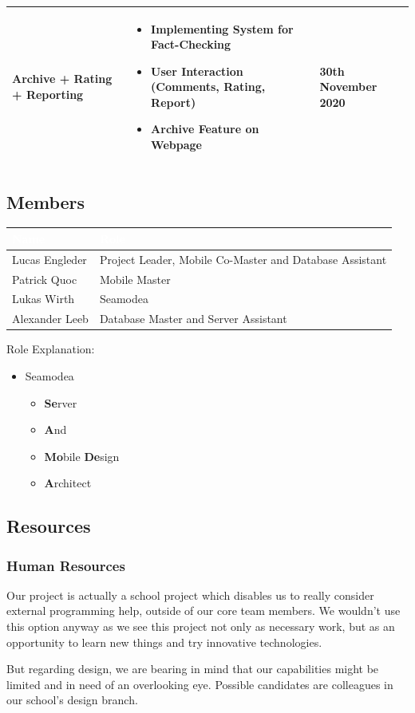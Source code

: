 \documentclass[12pt]{article}
\theoremstyle{definition}
\newenvironment{text}{
}{}
\begin{document}
\begin{tabular}{| m{9em} | m{9cm} | m{4cm} |}
    Archive + Rating + Reporting &
    \begin{itemize} [topsep=0.2cm]
        \item Implementing System for Fact-Checking
    	\item User Interaction (Comments, Rating, Report)
        \item Archive Feature on Webpage
    \end{itemize} \nointerlineskip &
    30th November 2020 \\ \hline
\end{tabular}

\subsection{Members}
\begin{tabular}{|l|l|}
\hline
\cellcolor[gray]{0.5}\textcolor{white}{Name} & \cellcolor[gray]{0.5}\textcolor{white}{Role}\\ \hline
Lucas Engleder & Project Leader, Mobile Co-Master and Database Assistant\\ \hline
Patrick Quoc & Mobile Master\\ \hline
Lukas Wirth & Seamodea \\  \hline
Alexander Leeb & Database Master and Server Assistant \\ \hline
\end{tabular}

Role Explanation:
\begin{itemize}
    \item Seamodea
    \begin{itemize}
        \item \textbf{Se}rver
        \item \textbf{A}nd
        \item \textbf{Mo}bile \textbf{De}sign
        \item \textbf{A}rchitect
    \end{itemize} 
\end{itemize}
\subsection{Resources}
\subsubsection{Human Resources}
\begin{text}
Our project is actually a school project which disables us to really consider external programming help, outside of our core team members. We wouldn't use this option anyway as we see this project not only as necessary work, but as an opportunity to learn new things and try innovative technologies.

But regarding design, we are bearing in mind that our capabilities might be limited and in need of an overlooking eye. Possible candidates are colleagues in our school's design branch.\end{text}
\end{document}
